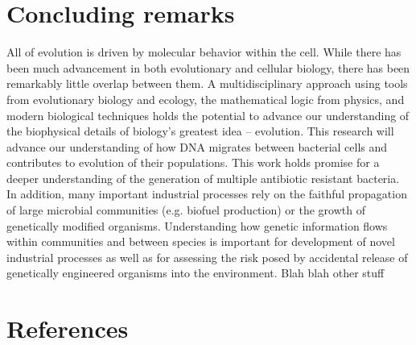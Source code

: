\section*{Concluding remarks}
All of evolution is driven by molecular behavior within the cell. While there has
been much advancement in both evolutionary and cellular biology, there has been
remarkably little overlap between them. A multidisciplinary approach using tools
from evolutionary biology and ecology, the mathematical logic from physics, and
modern biological techniques holds the potential to advance our understanding of
the biophysical details of biology's greatest idea
– evolution. This research will advance our understanding of how DNA migrates
between bacterial cells and contributes to evolution of their populations. This
work holds promise for a deeper understanding of the generation of multiple
antibiotic resistant bacteria. In addition, many important industrial processes
rely on the faithful propagation of large microbial communities (e.g. biofuel
production) or the growth of genetically modified organisms. Understanding how
genetic information flows within communities and between species is important
for development of novel industrial processes as well as for assessing the risk
posed by accidental release of genetically engineered organisms into the
environment. Blah blah other stuff


\section*{References}



